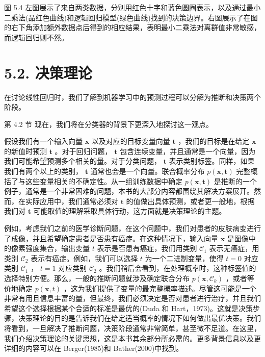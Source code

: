 \documentclass[10pt]{article}
\begin{document}
图 5.4 左图展示了来自两类数据，分别用红色十字和蓝色圆圈表示，以及通过最小二乘法(品红色曲线)和逻辑回归模型(绿色曲线)找到的决策边界。右图展示了在图的右下角添加额外数据点后得到的相应结果，表明最小二乘法对离群值非常敏感，而逻辑回归则不然。

\section*{5.2. 决策理论}

在讨论线性回归时，我们了解到机器学习中的预测过程可以分解为推断和决策两个阶段。

第 4.2 节 现在，我们将在分类器的背景下更深入地探讨这一观点。

假设我们有一个输入向量 \(\mathbf{x}\) 以及对应的目标变量向量 \(\mathbf{t}\) ，我们的目标是在给定 \(\mathbf{x}\) 的新值时预测 \(\mathbf{t}\) 。对于回归问题， \(\mathbf{t}\) 包含连续变量，并且通常是一个向量，因为我们可能希望预测多个相关的量。对于分类问题， \(\mathbf{t}\) 表示类别标签。同样，如果我们有两个以上的类别， \(\mathbf{t}\) 通常也会是一个向量。联合概率分布 \(p\left( {\mathbf{x},\mathbf{t}}\right)\) 完整概括了与这些变量相关的不确定性。从一组训练数据中确定 \(p\left( {\mathbf{x},\mathbf{t}}\right)\) 是推断的一个例子，通常是一个非常困难的问题，本书的大部分内容都围绕其解决方案展开。然而，在实际应用中，我们通常必须对 \(\mathbf{t}\) 的值做出具体预测，或者更一般地，根据我们对 \(\mathbf{t}\) 可能取值的理解采取具体行动，这方面就是决策理论的主题。

例如，考虑我们之前的医学诊断问题，在这个问题中，我们对患者的皮肤病变进行了成像，并且希望确定患者是否患有癌症。在这种情况下，输入向量 \(\mathbf{x}\) 是图像中的像素强度集合，输出变量 \(t\) 表示是否患有癌症，我们用类别 \({\mathcal{C}}_{1}\) 表示无癌症，用类别 \({\mathcal{C}}_{2}\) 表示有癌症。例如，我们可以选择 \(t\) 为一个二进制变量，使得 \(t = 0\) 对应类别 \({\mathcal{C}}_{1}\) ， \(t = 1\) 对应类别 \({\mathcal{C}}_{2}\) 。我们稍后会看到，在处理概率时，这种标签值的选择特别方便。那么，一般的推断问题就涉及确定联合分布 \(p\left( {\mathbf{x},{\mathcal{C}}_{k}}\right)\) ，或者等价地确定 \(p\left( {\mathbf{x},t}\right)\) ，这为我们提供了变量的最完整概率描述。尽管这可能是一个非常有用且信息丰富的量，但最终，我们必须决定是否对患者进行治疗，并且我们希望这个选择根据某个合适的标准是最优的(Duda 和 Hart，1973)。这就是决策步骤，决策理论的目的是告诉我们在给定适当概率的情况下如何做出最优决策。我们将看到，一旦解决了推断问题，决策阶段通常非常简单，甚至微不足道。在这里，我们介绍决策理论的关键思想，这是本书其余部分所必需的。更多背景信息以及更详细的内容可以在 Berger(1985)和 Bather(2000)中找到。
\end{document}

